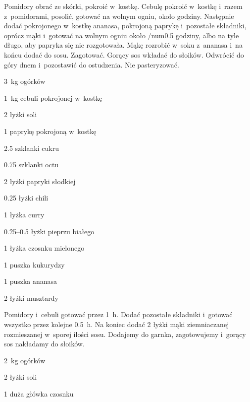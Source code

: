 \documentclass[../main.tex]{subfiles}
\begin{document}
Pomidory obrać ze skórki, pokroić w~kostkę. Cebulę pokroić w~kostkę i~razem
z~pomidorami, posolić, gotować na wolnym ogniu, około godziny. Następnie dodać
pokrojonego w~kostkę ananasa, pokrojoną paprykę i~pozostałe składniki, oprócz
mąki i~gotować na wolnym ogniu około /num{0.5} godziny, albo na tyle długo, aby
papryka się nie rozgotowała. Mąkę rozrobić w~soku z~ananasa i~na końcu dodać do
sosu. Zagotować. Gorący sos wkładać do słoików. Odwrócić do góry dnem
i~pozostawić do ostudzenia. Nie pasteryzować.


\begin{Ingred}
    \item \qty{3}{\kilo\gram} ogórków
    \item \qty{1}{\kilo\gram} cebuli pokrojonej w~kostkę
    \item \num{2} łyżki soli
    \item \num{1} paprykę pokrojoną w~kostkę
    \item \num{2.5} szklanki cukru
    \item \num{0.75} szklanki octu
    \item \num{2} łyżki papryki słodkiej
    \item \num{0.25} łyżki chili
    \item \num{1} łyżka curry
    \item \numrange{0.25}{0.5} łyżki pieprzu białego
    \item \num{1} łyżka czosnku mielonego
    \item \num{1} puszka kukurydzy
    \item \num{1} puszka ananasa
    \item \num{2} łyżki musztardy
\end{Ingred}

Pomidory i~cebuli gotować przez \qty{1}{\hour}. Dodać pozostałe składniki
i~gotować wszystko przez kolejne \qty{0.5}{\hour}. Na koniec dodać \num{2}
łyżki mąki ziemniaczanej rozmieszanej w~sporej ilości sosu. Dodajemy do garnka,
zagotowujemy i~gorący sos nakładamy do słoików.


\begin{Ingred}
    \item \qty{2}{\kilo\gram} ogórków
    \item \num{2} łyżki soli
    \item \num{1} duża główka czosnku
\end{Ingred}
\end{document}
